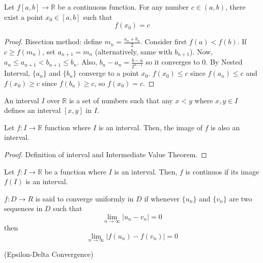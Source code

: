 \documentclass{article}
\begin{document}
\begin{theorem}
    Let $f[a,b]\rightarrow \mathbb{R}$ be a continuous function. For any number
    $c\in(a,b)$, there exist a point $x_0\in [a,b]$ such that
    \[f(x_0) = c\]
\end{theorem}

\begin{proof}
    Bisection method: define $m_n = \frac{a_n+b_n}{2}$. Consider first
    $f(a) < f(b)$. If $c\geq f(m_n)$, set $a_{n+1} = m_n$ (alternatively,
    same with $b_{n+1}$). Now, $a_n\leq a_{n+1} < b_{n+1} \leq b_n$.
    Also, $b_n-a_n = \frac{b-a}{2^{n-1}}$ so it converges to 0. By
    Nested Interval, $\{a_n\}$ and $\{b_n\}$ converge to a point $x_0$.
    $f(x_0) \leq c$ since $f(a_n) \leq c$ and $f(x_0) \geq c$ since 
    $f(b_n) \geq c$, so $f(x_0) = c$.
\end{proof}

\begin{definition}
    An interval $I$ over $\mathbb{R}$ is a set of numbers such that any
    $x<y$ where $x,y\in I$ defines an interval $[x,y]$ in $I$.
\end{definition}

\begin{theorem}
    Let $f:I\rightarrow \mathbb{R}$ function where $I$ is an interval.
    Then, the image of $f$ is also an interval.
\end{theorem}

\begin{proof}
    Definition of interval and Intermediate Value Theorem.
\end{proof}

\begin{theorem}
    Let $f:I\rightarrow \mathbb{R}$ be a function where $I$ is
    an interval. Then, $f$ is continuos if its image $f(I)$ is an
    interval.
\end{theorem}

\begin{definition}
    $f:D\rightarrow R$ is said to converge uniformly in $D$ if whenever
    $\{u_n\}$ and $\{v_n\}$ are two sequences in $D$ such that
    \[\lim_{n\rightarrow \infty} |u_n-v_n| = 0\]
    then
    \[\lim_{n\rightarrow \infty} |f(u_n) - f(v_n)| =0\]
\end{definition}

\begin{definition}
    (Epsilon-Delta Convergence)

\end{definition}
\end{document}
